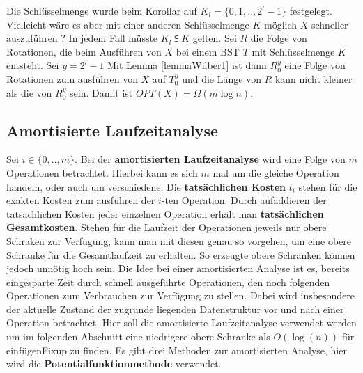 \documentclass[a4paper,12pt]{article}
\begin{document}
\noindent Die Schlüsselmenge  wurde beim Korollar auf ${K_l = \{0,1,..,2^l -1\}}$ festgelegt. Vielleicht wäre es aber mit einer anderen Schlüsselmenge $K$ möglich $X$ schneller auszuführen ? In jedem Fall müsste $K_l \subseteqq K$ gelten. Sei $R$ die Folge von Rotationen, die beim Ausführen von $X$ bei einem BST $T$ mit Schlüsselmenge $K$ entsteht. Sei $y = 2^l -1$ Mit Lemma \ref{lemmaWilber1} ist dann $R_0^y$ eine Folge von Rotationen zum ausführen von $X$ auf $T_0^y$ und die Länge von $R$ kann nicht kleiner als die von $R_0^y$ sein. Damit ist $\mathit{OPT}\left(X\right) = \Omega\left(m \log n \right)$. 



\subsection{Amortisierte Laufzeitanalyse}
Sei $i \in \{0,..,m\}$. Bei der \textbf{amortisierten Laufzeitanalyse} wird eine Folge von $m$ Operationen betrachtet. Hierbei kann es sich $m$ mal um die gleiche Operation handeln, oder auch um verschiedene. Die \textbf{tatsächlichen Kosten}  $t_i$ stehen für die exakten Kosten zum ausführen der $i$-ten Operation. Durch aufaddieren der tatsächlichen Kosten jeder einzelnen Operation erhält man \textbf{tatsächlichen Gesamtkosten}.  Stehen für die Laufzeit der Operationen jeweils nur obere Schraken zur Verfügung, kann man mit diesen genau so vorgehen, um eine obere Schranke für die Gesamtlaufzeit zu erhalten. So erzeugte obere Schranken können jedoch unnötig hoch sein. Die Idee bei einer amortisierten Analyse ist es, bereits eingesparte Zeit durch schnell ausgeführte Operationen, den noch folgenden Operationen zum Verbrauchen zur Verfügung zu stellen.  Dabei wird insbesondere der aktuelle Zustand der zugrunde liegenden Datenstruktur vor und nach einer Operation betrachtet. Hier soll die amortisierte Laufzeitanalyse verwendet werden um im folgenden Abschnitt eine niedrigere obere Schranke als $O(\log(n))$ für einfügenFixup zu finden. Es gibt drei Methoden zur amortisierten Analyse, hier wird die \textbf{Potentialfunktionmethode} verwendet.
\end{document}
